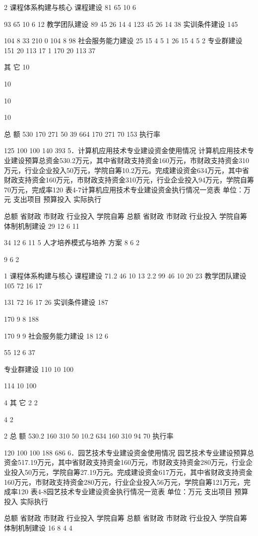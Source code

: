 2
课程体系构建与核心
课程建设
81
65
10
6

93
65
10
6
12
教学团队建设
89
45
26
14
4
123
45
26
14
38
实训条件建设
145

104
8
33
210
0
104
8
98
社会服务能力建设
25
15
4
5
1
26
15
4
5
2
专业群建设
151
20
113
17
1
170
20
113
37

其 它
10

10


10

10


总    额
530
170
271
50
39
664
170
271
70
153
执行率%

125
100
100
140
393
5．计算机应用技术专业建设资金使用情况
计算机应用技术专业建设预算总资金530.2万元，其中省财政支持资金160万元，市财政支持资金310万元，行业企业投入50万元，学院自筹10.2万元。完成建设资金634万元，其中省财政支持资金160万元，市财政支持资金310万元，行业企业投入94万元，学院自筹70万元，完成率120%
表4-7计算机应用技术专业建设资金执行情况一览表
单位：万元
支出项目
预算投入
实际执行

总额
省财政
市财政
行业投入
学院自筹
总额
省财政
市财政
行业投入
学院自筹
体制机制建设
29
12
6
11

34
12
6
11
5
人才培养模式与培养
方案
8
6
2


9
6
2

1
课程体系构建与核心
课程建设
71.2
46
10
13
2.2
99
46
10
20
23
教学团队建设
105
72
16
17

131
72
16
17
26
实训条件建设
187

170
9
8
188

170
9
9
社会服务能力建设
18
12
6


55
12
6
37

专业群建设
110
10
100


114
10
100

4
其 它
2
2



4
2


2
总    额
530.2
160
310
50
10.2
634
160
310
94
70
执行率%

120
100
100
188
686
6．园艺技术专业建设资金使用情况
园艺技术专业建设预算总资金517.19万元，其中省财政支持资金160万元，市财政支持资金280万元，行业企业投入50万元，学院自筹27.19万元。完成建设资金617万元，其中省财政支持资金160万元，市财政支持资金280万元，行业企业投入56万元，学院自筹121万元，完成率120%
表4-8园艺技术专业建设资金执行情况一览表
单位：万元
支出项目
预算投入
实际执行

总额
省财政
市财政
行业投入
学院自筹
总额
省财政
市财政
行业投入
学院自筹
体制机制建设
16
8
4
4


